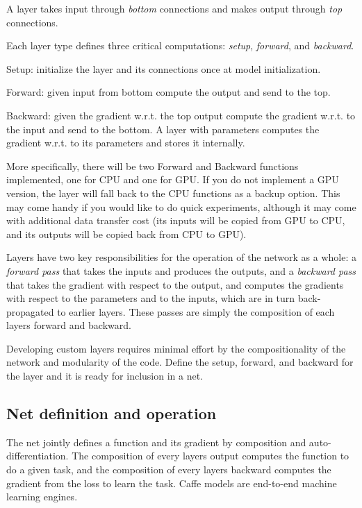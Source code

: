 A layer takes input through {\itshape bottom} connections and makes output through {\itshape top} connections.

Each layer type defines three critical computations\+: {\itshape setup}, {\itshape forward}, and {\itshape backward}.


\begin{DoxyItemize}
\item Setup\+: initialize the layer and its connections once at model initialization.
\item Forward\+: given input from bottom compute the output and send to the top.
\item Backward\+: given the gradient w.\+r.\+t. the top output compute the gradient w.\+r.\+t. to the input and send to the bottom. A layer with parameters computes the gradient w.\+r.\+t. to its parameters and stores it internally.
\end{DoxyItemize}

More specifically, there will be two Forward and Backward functions implemented, one for C\+PU and one for G\+PU. If you do not implement a G\+PU version, the layer will fall back to the C\+PU functions as a backup option. This may come handy if you would like to do quick experiments, although it may come with additional data transfer cost (its inputs will be copied from G\+PU to C\+PU, and its outputs will be copied back from C\+PU to G\+PU).

Layers have two key responsibilities for the operation of the network as a whole\+: a {\itshape forward pass} that takes the inputs and produces the outputs, and a {\itshape backward pass} that takes the gradient with respect to the output, and computes the gradients with respect to the parameters and to the inputs, which are in turn back-\/propagated to earlier layers. These passes are simply the composition of each layer\textquotesingle{}s forward and backward.

Developing custom layers requires minimal effort by the compositionality of the network and modularity of the code. Define the setup, forward, and backward for the layer and it is ready for inclusion in a net.

\subsection*{Net definition and operation}

The net jointly defines a function and its gradient by composition and auto-\/differentiation. The composition of every layer\textquotesingle{}s output computes the function to do a given task, and the composition of every layer\textquotesingle{}s backward computes the gradient from the loss to learn the task. Caffe models are end-\/to-\/end machine learning engines.


